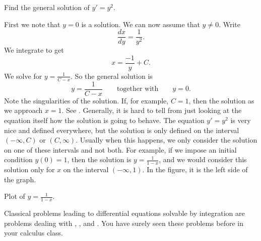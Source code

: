 \begin{example}
Find the general solution of
$y' = y^2$.

First we note that $y=0$ is a solution.  We can now assume that $y \not= 0$.
Write
\begin{equation*}
\frac{dx}{dy} = \frac{1}{y^2} .
\end{equation*}
We integrate to get
\begin{equation*}
x = \frac{-1}{y} + C .
\end{equation*}
We solve for $y = \frac{1}{C-x}$.
So the general solution is
\begin{equation*}
y = \frac{1}{C-x} \qquad \text{together with} \qquad y = 0.
\end{equation*}
Note the singularities of the solution.  If, for example, $C=1$, then the
solution  as we approach $x=1$.  See
.  Generally,
it is hard to tell
from just looking at the equation itself how the solution is going to behave.
The equation $y' = y^2$ is very nice and defined everywhere, but
the solution is only defined on the interval $(-\infty, C)$ or
$(C, \infty)$.  Usually when this happens, we only consider the solution
on one of these intervals and not both.
For example, if we impose an initial condition $y(0) = 1$, then
the solution is $y=\frac{1}{1-x}$, and we would consider this solution only
for $x$ on the interval $(-\infty,1)$.  In the figure, it is the left side
of the graph.
\begin{myfig}
\capstart
{}
\caption{Plot of $y=\frac{1}{1-x}$.\label{1over1mx:fig}}
\end{myfig}
\end{example}

Classical problems leading to differential equations solvable by integration
are problems 
dealing with ,
, and .  You have surely seen these
problems before in your calculus class.

